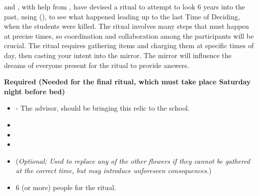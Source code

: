 \documentclass[green]{GL2020}
\begin{document}
\name{\gWhatHappenedSixYearsAgo{}}

\cPresident{}and \cHeir{}, with help from \cWildCard{}, have devised a ritual to attempt to look 6 years into the past, using \iMirror{\MYname} (\iMirror{\MYnumber}), to see what happened leading up to the last Time of Deciding, when the students were killed. The ritual involves many steps that must happen at precise times, so coordination and collaboration among the participants will be crucial. The ritual requires gathering items and charging them at specific times of day, then casting your intent into the mirror. The mirror will influence the dreams of everyone present for the ritual to provide answers.

\textbf{Required (Needed for the final ritual, which must take place Saturday night before bed)}
\begin{itemize}
  \item \iMirror{} - The \pTech{} advisor, \cDiplomat{\full} should be bringing this relic to the school.
  \item \iMorningGlory{}
  \item \iLily{}
  \item \iMoonflower{}
  \item \iStoneFlower{} (\emph{Optional; Used to replace any of the other flowers if they cannot be gathered at the correct time, but may introduce unforeseen consequences.})
  \item 6 (or more) people for the ritual.
\end{itemize}
\end{document}

